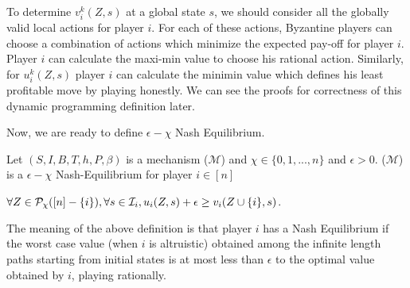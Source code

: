 %



To determine $v^{k}_i(Z,s)$ at a global state $s$, we should consider all the globally valid local actions for player $i$. For each of these actions, Byzantine players can choose a combination of actions which minimize the expected pay-off for player $i$. Player $i$ can calculate the maxi-min value to choose his rational action. Similarly, for $u^{k}_i(Z,s)$ player $i$ can calculate the minimin value which defines his least profitable move by playing honestly. We can see the proofs for correctness of this dynamic programming definition later.

Now, we are ready to define $\epsilon-\chi$ Nash Equilibrium.

\begin{definition}
Let $(S,I,B,T,h,P,\beta)$ is a mechanism ($\mathcal{M}$) and $\chi \in \{0, 1, $...$,n\} $ and $\epsilon > 0$. ($\mathcal{M}$) is a $\epsilon-\chi$ Nash-Equilibrium  for player $i \in [n]$ \newline
\begin{center}
	 $\forall Z \in \mathcal{P}_{\chi}([n]-\{i\}), \forall s \in \mathcal{I}_i, \newline
	u_{i}(Z,s) + \epsilon \geq v_{i}(Z \cup \{i\},s)$.
	\end{center}
	
\end{definition}
\cite{MMS08}

The meaning of the above definition is that player $i$ has a Nash Equilibrium if the worst case value (when $i$ is altruistic) obtained among the infinite length paths starting from initial states is at most less than $\epsilon$ to the optimal value obtained by $i$, playing rationally.

